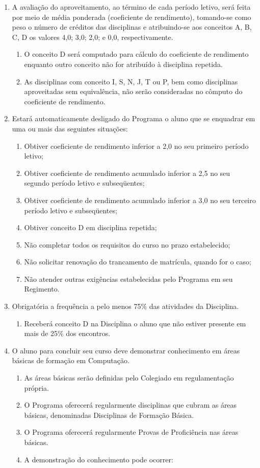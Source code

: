 \documentclass{article}
\newcommand{\singleitem}{\item[Parágrafo Único.]}
\begin{document}
\begin{enumerate}
	\item A avaliação do aproveitamento, ao término de cada período letivo, será feita por meio de média ponderada (coeficiente de rendimento), tomando-se como peso o número de créditos das disciplinas e atribuindo-se aos conceitos A, B, C, D os valores 4,0; 3,0; 2,0; e 0,0, respectivamente.

	\begin{enumerate}
		\item O conceito D será computado para cálculo do coeficiente de rendimento enquanto outro conceito não for atribuído à disciplina repetida.
		\item As disciplinas com conceito I, S, N, J, T ou P, bem como disciplinas aproveitadas sem equivalência, não serão consideradas no cômputo do coeficiente de rendimento.
	\end{enumerate}

	\item Estará automaticamente desligado do Programa o aluno que se enquadrar em uma ou mais das seguintes situações:
	\begin{enumerate}[label=\Roman*]
		\item Obtiver coeficiente de rendimento inferior a 2,0 no seu primeiro período letivo;
		\item Obtiver coeficiente de rendimento acumulado inferior a 2,5 no seu segundo período letivo e subseqüentes;
		\item Obtiver coeficiente de rendimento acumulado inferior a 3,0 no seu terceiro período letivo e subseqüentes;
		\item Obtiver conceito D em disciplina repetida;
		\item Não completar todos os requisitos do curso no prazo estabelecido;
		\item Não solicitar renovação do trancamento de matrícula, quando for o caso;
		\item Não atender outras exigências estabelecidas pelo Programa em seu Regimento.
	\end{enumerate}

	\item  Obrigatória a frequência a pelo menos 75\% das atividades da Disciplina.
	\begin{enumerate}
		\singleitem Receberá conceito D na Disciplina o aluno que não estiver presente em mais de 25\% dos encontros.
	\end{enumerate}

	\item O aluno para concluir seu curso deve demonstrar conhecimento em áreas básicas de formação em Computação.
	\begin{enumerate}
		\item As áreas básicas serão definidas pelo Colegiado em regulamentação própria.
		\item O Programa oferecerá regularmente disciplinas que cubram as áreas básicas, denominadas Disciplinas de Formação Básica.
		\item O Programa oferecerá regularmente Provas de Proficiência nas áreas básicas.
		\item A demonstração do conhecimento pode ocorrer:


\end{enumerate}
\end{enumerate}
\end{document}
